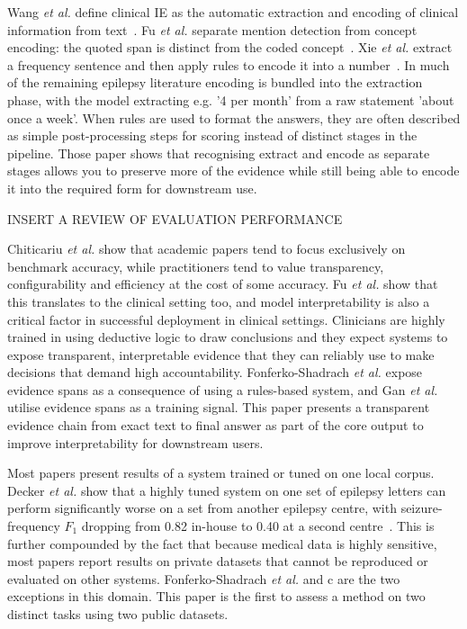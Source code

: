 \documentclass[conference]{IEEEtran}
\begin{document}
Wang \emph{et al.} define clinical IE as the automatic 
extraction and encoding of clinical information from 
text~\cite{b8}. Fu \emph{et al.} separate mention detection 
from concept encoding: the quoted span is distinct from
the coded concept~\cite{b6}. Xie \emph{et al.} extract a frequency 
sentence and then apply rules to encode it into a number~\cite{b9}. 
In much of the remaining epilepsy literature encoding is 
bundled into the extraction phase, with the model 
extracting e.g. '4 per month' from a raw statement 'about once 
a week'. When rules are used to format the answers, they are 
often described as simple post-processing steps for scoring 
instead of distinct stages in the pipeline. Those paper shows 
that recognising extract and encode as separate stages 
allows you to preserve more of the evidence while still 
being able to encode it into the required form for 
downstream use.

INSERT A REVIEW OF EVALUATION PERFORMANCE

Chiticariu \emph{et al.} show that academic papers tend to focus 
exclusively on benchmark accuracy, while practitioners tend 
to value transparency, configurability and efficiency at the 
cost of some accuracy. Fu \emph{et al.} show that this 
translates to the clinical setting too, and model interpretability 
is also a critical factor in successful deployment in clinical 
settings. Clinicians are highly trained in using deductive 
logic to draw conclusions and they expect systems to 
expose transparent, interpretable evidence that they can  
reliably use to make decisions that demand high 
accountability. Fonferko-Shadrach \emph{et al.} expose 
evidence spans as a consequence of using a rules-based 
system, and Gan \emph{et al.} utilise evidence spans as a 
training signal. This paper presents a transparent evidence 
chain from exact text to final answer as part of the core 
output to improve interpretability for downstream users.

Most papers present results of a system trained or tuned on 
one local corpus. Decker \emph{et al.} show that a highly 
tuned system on one set of epilepsy letters can perform 
significantly worse on a set from another epilepsy centre, 
with seizure-frequency $F_1$ dropping from 0.82 in-house 
to 0.40 at a second centre~\cite{b12}. This is further 
compounded by the fact that because medical data is highly
sensitive, most papers report results on private datasets 
that cannot be reproduced or evaluated on other systems. 
Fonferko-Shadrach \emph{et al.} and c
are the two exceptions in this domain. This paper is the
first to assess a method on two distinct tasks using two
public datasets. 
\end{document}
